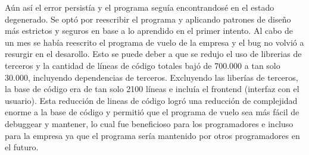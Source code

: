 Aún así el error persistía y el programa seguía encontrandosé en el estado degenerado. Se optó por reescribir el programa y aplicando patrones de diseño más estrictos y seguros en base a lo aprendido en el primer intento. Al cabo de un mes se había reescrito el programa de vuelo de la empresa y el bug no volvió a resurgir en el desarollo. Esto se puede deber a que se redujo el uso de librerias de terceros y la cantidad de líneas de código totales bajó de 700.000 a tan solo 30.000, incluyendo dependencias de terceros. Excluyendo las liberías de terceros, la base de código era de tan solo 2100 líneas e incluía el frontend (interfaz con el usuario). Esta reducción de lineas de código logró una reducción de complejidad enorme a la base de código y permitió que el programa de vuelo sea más fácil de debuggear y mantener, lo cual fue beneficioso para los programadores e incluso para la empresa ya que el programa sería mantenido por otros programadores en el futuro.

